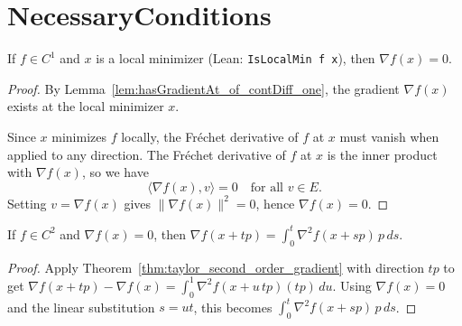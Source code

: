 
\chapter{NecessaryConditions}\label{sec:NecessaryConditions}

\begin{theorem}\label{thm:local_min_gradient_zero}
  \leanok{}
  If $f\in C^1$ and $x$ is a local minimizer (Lean: \texttt{IsLocalMin f x}), then $\nabla f(x)=0$.
\end{theorem}

\begin{proof}
  \leanok{}
  By Lemma~\ref{lem:hasGradientAt_of_contDiff_one}, the gradient $\nabla f(x)$ exists at the local minimizer $x$.

  Since $x$ minimizes $f$ locally, the Fr\'echet derivative of $f$ at $x$ must vanish when applied to any direction.
  The Fr\'echet derivative of $f$ at $x$ is the inner product with $\nabla f(x)$, so we have
  \[
    \langle \nabla f(x), v \rangle = 0 \quad \text{for all } v \in E.
  \]
  Setting $v = \nabla f(x)$ gives $\|\nabla f(x)\|^2 = 0$, hence $\nabla f(x) = 0$.
\end{proof}

\begin{lemma}\label{lem:gradient_line_eq_integral_hessian}
  \leanok{}
  If $f\in C^2$ and $\nabla f(x)=0$, then
  $\nabla f(x+t p)=\int_0^t \nabla^2 f(x+s p)\,p\,ds$.
\end{lemma}
\begin{proof}
  \leanok{}
  Apply Theorem~\ref{thm:taylor_second_order_gradient} with direction $tp$ to get
  $\nabla f(x+tp) - \nabla f(x) = \int_0^1 \nabla^2 f(x+u\,tp)(tp)\,du$. Using $\nabla f(x)=0$ and
  the linear substitution $s=ut$, this becomes $\int_0^t \nabla^2 f(x+sp)\,p\,ds$.
\end{proof}

